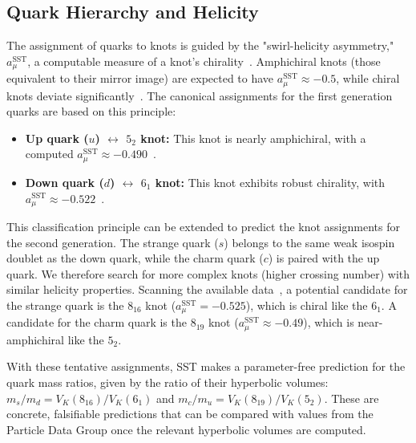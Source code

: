 \documentclass[11pt, a4paper]{article}
\begin{document}
    \subsection{Quark Hierarchy and Helicity}

        The assignment of quarks to knots is guided by the "swirl-helicity asymmetry," $a_{\mu}^{\text{SST}}$, a computable measure of a knot's chirality~\cite{sst_canon}. Amphichiral knots (those equivalent to their mirror image) are expected to have $a_{\mu}^{\text{SST}} \approx -0.5$, while chiral knots deviate significantly~\cite{sst_canon}. The canonical assignments for the first generation quarks are based on this principle:
        \begin{itemize}
        \item \textbf{Up quark ($u$) $\leftrightarrow$ $5_2$ knot:} This knot is nearly amphichiral, with a computed $a_{\mu}^{\text{SST}} \approx -0.490$~\cite{sst_canon}.
        \item \textbf{Down quark ($d$) $\leftrightarrow$ $6_1$ knot:} This knot exhibits robust chirality, with $a_{\mu}^{\text{SST}} \approx -0.522$~\cite{sst_canon}.
        \end{itemize}
        This classification principle can be extended to predict the knot assignments for the second generation. The strange quark ($s$) belongs to the same weak isospin doublet as the down quark, while the charm quark ($c$) is paired with the up quark. We therefore search for more complex knots (higher crossing number) with similar helicity properties. Scanning the available data~\cite{sst_canon}, a potential candidate for the strange quark is the $8_{16}$ knot ($a_{\mu}^{\text{SST}} = -0.525$), which is chiral like the $6_1$. A candidate for the charm quark is the $8_{19}$ knot ($a_{\mu}^{\text{SST}} \approx -0.49$), which is near-amphichiral like the $5_2$.

        With these tentative assignments, SST makes a parameter-free prediction for the quark mass ratios, given by the ratio of their hyperbolic volumes: $m_s/m_d = V_K(8_{16}) / V_K(6_1)$ and $m_c/m_u = V_K(8_{19}) / V_K(5_2)$. These are concrete, falsifiable predictions that can be compared with values from the Particle Data Group once the relevant hyperbolic volumes are computed.
\end{document}
